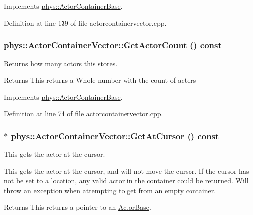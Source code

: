 Implements \hyperlink{classphys_1_1ActorContainerBase_a2e4652bf92f24a0ff20bdc4a7173b567}{phys::ActorContainerBase}.



Definition at line 139 of file actorcontainervector.cpp.

\hypertarget{classphys_1_1ActorContainerVector_a6d2e5e68e23f5798ad10ba41e479d0f7}{
\subsubsection[{GetActorCount}]{ phys::ActorContainerVector::GetActorCount () const}}
\label{d3/d64/classphys_1_1ActorContainerVector_a6d2e5e68e23f5798ad10ba41e479d0f7}


Returns how many actors this stores. 

\begin{DoxyReturn}{Returns}
This returns a Whole number with the count of actors 
\end{DoxyReturn}


Implements \hyperlink{classphys_1_1ActorContainerBase_aa5ec651d4634b2d90efe2a76f9d2fbdd}{phys::ActorContainerBase}.



Definition at line 74 of file actorcontainervector.cpp.

\hypertarget{classphys_1_1ActorContainerVector_a280700490b368a963dd8feae044c7a6d}{
\subsubsection[{GetAtCursor}]{ $\ast$ phys::ActorContainerVector::GetAtCursor () const}}
\label{d3/d64/classphys_1_1ActorContainerVector_a280700490b368a963dd8feae044c7a6d}


This gets the actor at the cursor. 

This gets the actor at the cursor, and will not move the cursor. If the cursor has not be set to a location, any valid actor in the container could be returned. Will throw an exception when attempting to get from an empty container. \begin{DoxyReturn}{Returns}
This returns a pointer to an \hyperlink{classphys_1_1ActorBase}{ActorBase}. 
\end{DoxyReturn}


